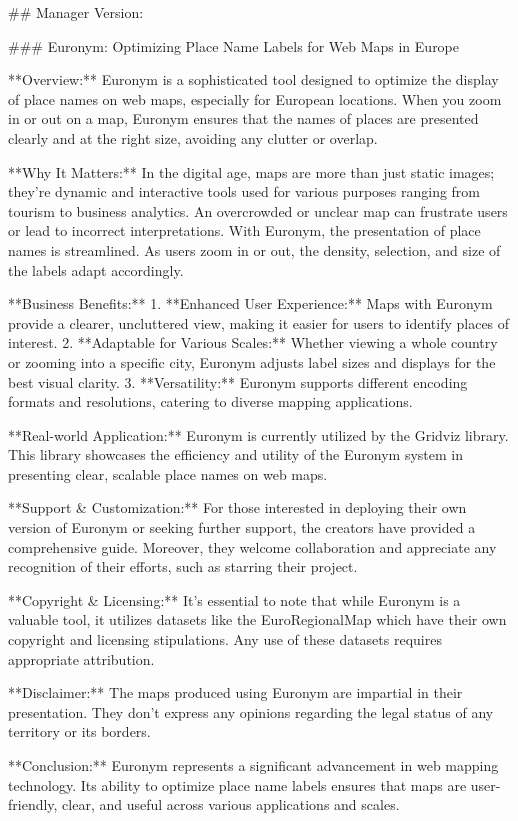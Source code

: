 ## Manager Version:

### Euronym: Optimizing Place Name Labels for Web Maps in Europe

**Overview:**  
Euronym is a sophisticated tool designed to optimize the display of place names on web maps, especially for European locations. When you zoom in or out on a map, Euronym ensures that the names of places are presented clearly and at the right size, avoiding any clutter or overlap.

**Why It Matters:**  
In the digital age, maps are more than just static images; they're dynamic and interactive tools used for various purposes ranging from tourism to business analytics. An overcrowded or unclear map can frustrate users or lead to incorrect interpretations. With Euronym, the presentation of place names is streamlined. As users zoom in or out, the density, selection, and size of the labels adapt accordingly.

**Business Benefits:**  
1. **Enhanced User Experience:** Maps with Euronym provide a clearer, uncluttered view, making it easier for users to identify places of interest.
2. **Adaptable for Various Scales:** Whether viewing a whole country or zooming into a specific city, Euronym adjusts label sizes and displays for the best visual clarity.
3. **Versatility:** Euronym supports different encoding formats and resolutions, catering to diverse mapping applications.

**Real-world Application:**  
Euronym is currently utilized by the Gridviz library. This library showcases the efficiency and utility of the Euronym system in presenting clear, scalable place names on web maps.

**Support & Customization:**  
For those interested in deploying their own version of Euronym or seeking further support, the creators have provided a comprehensive guide. Moreover, they welcome collaboration and appreciate any recognition of their efforts, such as starring their project.

**Copyright & Licensing:**  
It's essential to note that while Euronym is a valuable tool, it utilizes datasets like the EuroRegionalMap which have their own copyright and licensing stipulations. Any use of these datasets requires appropriate attribution.

**Disclaimer:**  
The maps produced using Euronym are impartial in their presentation. They don't express any opinions regarding the legal status of any territory or its borders.

**Conclusion:**  
Euronym represents a significant advancement in web mapping technology. Its ability to optimize place name labels ensures that maps are user-friendly, clear, and useful across various applications and scales.